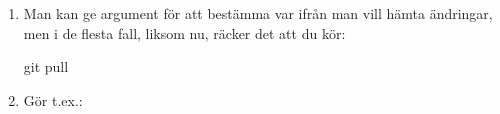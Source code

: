 \begin{enumerate}[label=C\arabic*]
\item\label{git-pull-term} Man kan ge argument för att bestämma var ifrån man vill hämta ändringar, men i de flesta fall, liksom nu, räcker det att du kör:
\begin{Code}
git pull
\end{Code}

\item\label{git-conflict-1} Gör t.ex.:


\end{enumerate}

